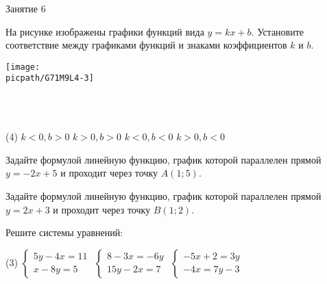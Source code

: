 \begin{class}[number=6]
	\begin{listofex}
		\item Занятие 6
	\end{listofex}
\end{class}

\begin{homework}[number=3]
	\begin{listofex}
		\item На рисунке изображены графики функций вида \(y = kx + b\). Установите соответствие между графиками функций и знаками коэффициентов \(k\) и \(b\).
		\begin{minipage}[t]{\linewidth}
			\texttt{[image: \\picpath/G71M9L4-3]}
		\end{minipage}
		\\
		\\
		\begin{minipage}[t]{\linewidth}
			\begin{tasks}(4)
				\task \( k<0, b>0 \)
				\task \( k>0, b>0 \)
				\task \( k<0, b<0 \)
				\task \( k>0, b<0 \)
			\end{tasks}
		\end{minipage}
		\item Задайте формулой линейную функцию, график которой параллелен прямой \(y=-2x+5\) и проходит через точку \( A(1; 5) \).
		\item Задайте формулой линейную функцию, график которой параллелен прямой \(y=2x+3\) и проходит через точку \( B(1; 2) \).
		\item Решите системы уравнений:
		\begin{tasks}(3)
			\task \( \begin{cases} 5y-4x=11 \\ x-8y=5 \end{cases} \)
			\task \( \begin{cases} 8-3x=-6y \\ 15y-2x=7 \end{cases} \)
			\task \( \begin{cases} -5x+2=3y \\ -4x=7y-3 \end{cases} \)
		\end{tasks}
	\end{listofex}
\end{homework}

